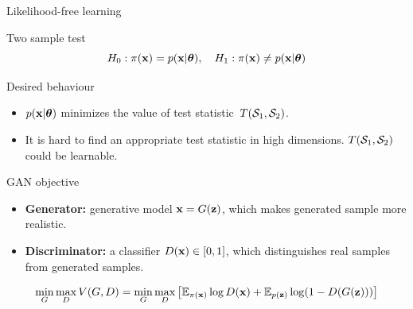 \begin{frame}{Likelihood-free learning}
	\begin{block}{Two sample test}
		\vspace{-0.5cm}
		\[
			H_0: \pi(\mathbf{x}) = p(\mathbf{x} | \boldsymbol{\theta}), \quad H_1: \pi(\mathbf{x}) \neq p(\mathbf{x} | \boldsymbol{\theta})
		\]
		\vspace{-0.8cm}
	\end{block}
	\begin{block}{Desired behaviour}
		\begin{itemize}
			\item $p(\mathbf{x} | \boldsymbol{\theta})$ minimizes the value of test statistic~$T(\mathcal{S}_1, \mathcal{S}_2)$.
			\item It is hard to find an appropriate test statistic in high dimensions. $T(\mathcal{S}_1, \mathcal{S}_2)$ could be learnable.
		\end{itemize}
	\end{block}
	\vspace{-0.3cm}
	\begin{block}{GAN objective}
		\begin{itemize}
			\item \textbf{Generator:} generative model $\mathbf{x} = G(\mathbf{z})$, which makes generated sample more realistic.
			\item \textbf{Discriminator:} a classifier $D(\mathbf{x}) \in [0, 1]$, which distinguishes real samples from generated samples.
		\end{itemize}
		\[
			\min_{G} \max_D V(G, D) = \min_{G} \max_D \left[ \mathbb{E}_{\pi(\mathbf{x})} \log D(\mathbf{x}) + \mathbb{E}_{p(\mathbf{z})} \log (1 - D(G(\mathbf{z}))) \right]
		\]
	\end{block}
\end{frame}
